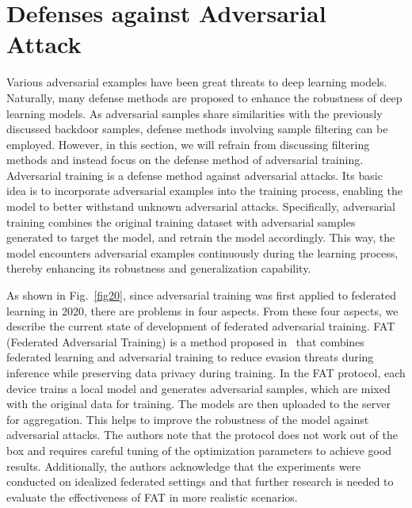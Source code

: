 \documentclass[a4paper,fleqn]{cas-dc}
\begin{document}
\section{Defenses against Adversarial Attack}
\label{Defenses against Adversarial Attack}
Various adversarial examples have been great threats to
deep learning models. Naturally, many defense methods
are proposed to enhance the robustness of deep learning
models. As adversarial samples share similarities with the
previously discussed backdoor samples, defense methods
involving sample filtering can be employed. However, in
this section, we will refrain from discussing filtering methods and instead focus on the defense method of adversarial
training. Adversarial training is a defense method against
adversarial attacks. Its basic idea is to incorporate
adversarial examples into the training process, enabling the
model to better withstand unknown adversarial attacks.
Specifically, adversarial training combines the original
training dataset with adversarial samples generated to
target the model, and retrain the model accordingly. This
way, the model encounters adversarial examples
continuously during the learning process, thereby enhancing
its robustness and generalization capability.

As shown in Fig.~\ref{fig20}, since adversarial training was first applied to
federated learning in 2020, there are problems in four
aspects. From these four aspects, we describe the current
state of development of federated adversarial training.
FAT (Federated Adversarial Training) is a method
proposed in~\cite{zizzo2020fat} that combines federated learning and
adversarial training to reduce evasion threats during
inference while preserving data privacy during training.
In the FAT protocol, each device trains a local model and
generates adversarial samples, which are mixed with the
original data for training. The models are then uploaded
to the server for aggregation. This helps to improve the
robustness of the model against adversarial attacks. The
authors note that the protocol does not work out of
the box and requires careful tuning of the optimization
parameters to achieve good results. Additionally, the
authors acknowledge that the experiments were conducted
on idealized federated settings and that further research
is needed to evaluate the effectiveness of FAT in more
realistic scenarios.
\end{document}
